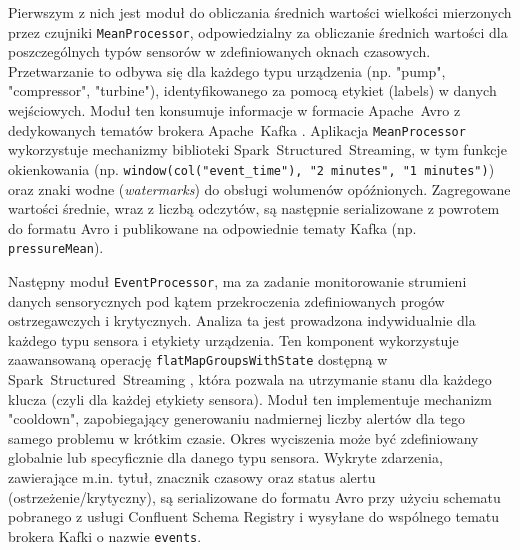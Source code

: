 Pierwszym z nich jest moduł do obliczania średnich wartości wielkości mierzonych przez czujniki \texttt{MeanProcessor}, odpowiedzialny za obliczanie średnich wartości dla poszczególnych typów sensorów w zdefiniowanych oknach czasowych. Przetwarzanie to odbywa się dla każdego typu urządzenia (np. "pump", "compressor", "turbine"), identyfikowanego za pomocą etykiet (labels) w danych wejściowych. Moduł ten konsumuje informacje w formacie \mbox{Apache Avro} \cite{avro_documentation} z dedykowanych tematów brokera \mbox{Apache Kafka} \cite{kafka}. Aplikacja \texttt{MeanProcessor} wykorzystuje mechanizmy biblioteki \mbox{Spark Structured Streaming}, w tym funkcje okienkowania (np. \texttt{window(col("event\_time"), "2 minutes", "1 minutes")}) oraz znaki wodne (\textit{watermarks}) \cite{watermarking} do obsługi wolumenów opóźnionych. Zagregowane wartości średnie, wraz z liczbą odczytów, są następnie serializowane z powrotem do formatu Avro i publikowane na odpowiednie tematy Kafka (np. \texttt{pressureMean}).

Następny moduł \texttt{EventProcessor}, ma za zadanie monitorowanie strumieni danych sensorycznych pod kątem przekroczenia zdefiniowanych progów ostrzegawczych i krytycznych. Analiza ta jest prowadzona indywidualnie dla każdego typu sensora i etykiety urządzenia. Ten komponent wykorzystuje zaawansowaną operację \texttt{flatMapGroupsWithState} dostępną w \mbox{Spark Structured Streaming} \cite{spark_streaming} , która pozwala na utrzymanie stanu dla każdego klucza (czyli dla każdej etykiety sensora). Moduł ten implementuje mechanizm "cooldown", zapobiegający generowaniu nadmiernej liczby alertów dla tego samego problemu w krótkim czasie. Okres wyciszenia może być zdefiniowany globalnie lub specyficznie dla danego typu sensora. Wykryte zdarzenia, zawierające m.in. tytuł, znacznik czasowy oraz status alertu (ostrzeżenie/krytyczny), są serializowane do formatu Avro przy użyciu schematu pobranego z usługi Confluent Schema Registry \cite{confluent_schema_registry} i wysyłane do wspólnego tematu brokera Kafki o nazwie \texttt{events}.

